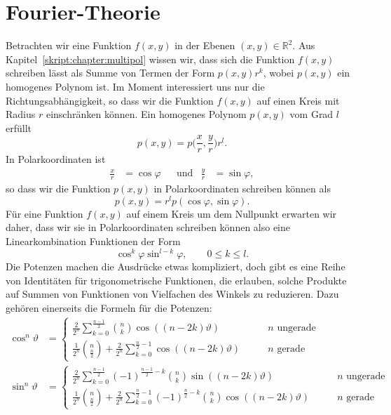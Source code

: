 \section{Fourier-Theorie}
Betrachten wir eine Funktion $f(x,y)$ in der Ebenen $(x,y)\in\mathbb R^2$.
Aus Kapitel~\ref{skript:chapter:multipol} wissen wir, dass sich die Funktion
$f(x,y)$ schreiben lässt als Summe von Termen der Form $p(x,y)r^k$, wobei
$p(x,y)$ ein homogenes Polynom ist.
Im Moment interessiert uns nur die Richtungsabhängigkeit, so dass wir
die Funktion $f(x,y)$ auf einen Kreis mit Radius $r$ einschränken können.
Ein homogenes Polynom $p(x,y)$ vom Grad $l$ erfüllt
\[
p(x,y) = p\biggl(\frac{x}{r},\frac{y}{r}\biggr) r^l.
\]
In Polarkoordinaten ist
\[
\begin{aligned}
\frac{x}{r}&=\cos\varphi
&&\text{und}&
\frac{y}{r}&=\sin\varphi,
\end{aligned}
\]
so dass wir die Funktion $p(x,y)$ in Polarkoordinaten schreiben
können als
\[
p(x,y)=r^l p(\cos\varphi,\sin\varphi).
\]
Für eine Funktion $f(x,y)$ auf einem Kreis um dem Nullpunkt erwarten wir
daher, dass wir sie in Polarkoordinaten schreiben können also eine
Linearkombination Funktionen der Form
\begin{equation}
\cos^k\varphi \sin^{l-k}\varphi,\qquad 0\le k\le l.
\label{skript:kugelfunktionen:produkte}
\end{equation}
Die Potenzen machen die Ausdrücke etwas kompliziert, doch gibt
es eine Reihe von Identitäten für trigonometrische Funktionen,
die erlauben, solche Produkte auf Summen von Funktionen von 
Vielfachen des Winkels zu reduzieren.
Dazu gehören einerseits die Formeln für die Potenzen:
\begin{align*}
\cos^n\vartheta
&=
\begin{cases}
\displaystyle
\frac{2}{2^n}\sum_{k=0}^{\frac{n-1}2} \binom{n}{k}\cos((n-2k)\vartheta)
&\qquad\text{$n$ ungerade}
\\[10pt]
\displaystyle
\frac{1}{2^n}\binom{n}{\frac{n}2}
+
\frac{2}{2^n}\sum_{k=0}^{\frac{n}2-1}\cos((n-2k)\vartheta)
&\qquad\text{$n$ gerade}
\end{cases}
\\
\sin^n\vartheta
&=
\begin{cases}
\displaystyle
\frac{2}{2^n}\sum_{k=0}^{\frac{n-1}2} (-1)^{\frac{n-1}2-k}\binom{n}{k}\sin((n-2k)\vartheta)
&\qquad\text{$n$ ungerade}
\\[10pt]
\displaystyle
\frac{1}{2^n}\binom{n}{\frac{n}2}
+
\frac{2}{2^n}\sum_{k=0}^{\frac{n}2-1}(-1)^{\frac{n}2-k}\binom{n}{k}\cos((n-2k)\vartheta)
&\qquad\text{$n$ gerade}
\end{cases}
\end{align*}
